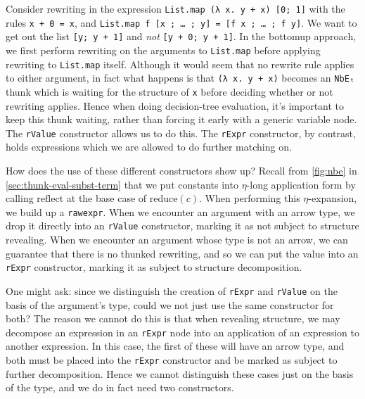 Consider rewriting in the expression \texttt{List.map (λ x. y + x) [0; 1]} with the rules \texttt{x + 0 = x}, and \texttt{List.map f [x ; … ; y] = [f x ; … ; f y]}.
We want to get out the list \texttt{[y; y + 1]} and \emph{not} \texttt{[y + 0; y + 1]}.
In the bottomup approach, we first perform rewriting on the arguments to \texttt{List.map} before applying rewriting to \texttt{List.map} itself.
Although it would seem that no rewrite rule applies to either argument, in fact what happens is that \texttt{(λ x. y + x)} becomes an \texttt{NbEₜ} thunk which is waiting for the structure of \texttt{x} before deciding whether or not rewriting applies.
Hence when doing decision-tree evaluation, it's important to keep this thunk waiting, rather than forcing it early with a generic variable node.
The \texttt{rValue} constructor allows us to do this.
The \texttt{rExpr} constructor, by contrast, holds expressions which we are allowed to do further matching on.

How does the use of these different constructors show up?
Recall from \autoref{fig:nbe} in \autoref{sec:thunk-eval-subst-term} that we put constants into $\eta$-long application form by calling $\text{reflect}$ at the base case of $\text{reduce}(c)$.
When performing this $\eta$-expansion, we build up a \texttt{rawexpr}.
When we encounter an argument with an arrow type, we drop it directly into an \texttt{rValue} constructor, marking it as not subject to structure revealing.
When we encounter an argument whose type is not an arrow, we can guarantee that there is no thunked rewriting, and so we can put the value into an \texttt{rExpr} constructor, marking it as subject to structure decomposition.

One might ask: since we distinguish the creation of \texttt{rExpr} and \texttt{rValue} on the basis of the argument's type, could we not just use the same constructor for both?
The reason we cannot do this is that when revealing structure, we may decompose an expression in an \texttt{rExpr} node into an application of an expression to another expression.
In this case, the first of these will have an arrow type, and both must be placed into the \texttt{rExpr} constructor and be marked as subject to further decomposition.
Hence we cannot distinguish these cases just on the basis of the type, and we do in fact need two constructors.

